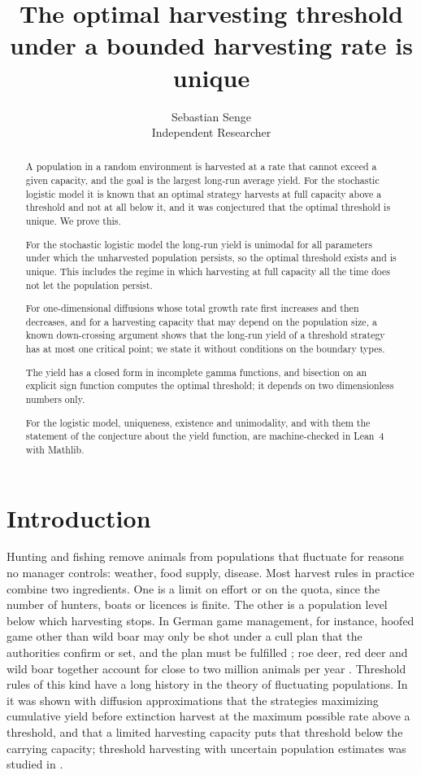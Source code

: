 \documentclass[11pt]{article}
\title{The optimal harvesting threshold\\ under a bounded harvesting rate is unique}
\author{Sebastian Senge\\Independent Researcher}
\date{}
\theoremstyle{definition}
\begin{document}
\maketitle

\begin{abstract}
A population in a random environment is harvested at a rate that cannot exceed a given capacity, and the goal is
the largest long-run average yield. For the stochastic logistic model it is known that an optimal strategy
harvests at full capacity above a threshold and not at all below it, and it was conjectured that the optimal
threshold is unique. We prove this.

For the stochastic logistic model the long-run yield is unimodal for all parameters under which the
unharvested population persists, so the optimal threshold exists and is unique. This includes the regime in which
harvesting at full capacity all the time does not let the population persist.

For one-dimensional diffusions whose total growth rate first increases and then decreases, and for a harvesting
capacity that may depend on the population size, a known down-crossing argument shows that the long-run yield of
a threshold strategy has at most one critical point; we state it without conditions on the boundary types.

The yield has a closed form in incomplete gamma functions, and bisection on an explicit sign function computes
the optimal threshold; it depends on two dimensionless numbers only.

For the logistic model, uniqueness, existence and unimodality, and with them the statement of the conjecture
about the yield function, are machine-checked in Lean~4 with Mathlib.
\end{abstract}

\section{Introduction}

Hunting and fishing remove animals from populations that fluctuate for reasons no manager controls: weather,
food supply, disease. Most harvest rules in practice combine two ingredients. One is a limit on effort or on the
quota, since the number of hunters, boats or licences is finite. The other is a population level below which
harvesting stops. In German game management, for instance, hoofed game other than wild boar may only be shot
under a cull plan that the authorities confirm or set, and the plan must be fulfilled \cite{bjagdg}; roe deer, red deer and
wild boar together account for close to two million animals per year \cite{djv}. Threshold rules of this kind
have a long history in the theory of fluctuating populations. In \cite{lande95} it was shown with
diffusion approximations that the strategies maximizing cumulative yield before extinction harvest at the
maximum possible rate above a threshold, and that a limited harvesting capacity puts that threshold below the
carrying capacity; threshold harvesting with uncertain population estimates was studied in \cite{lande97}.
\end{document}
